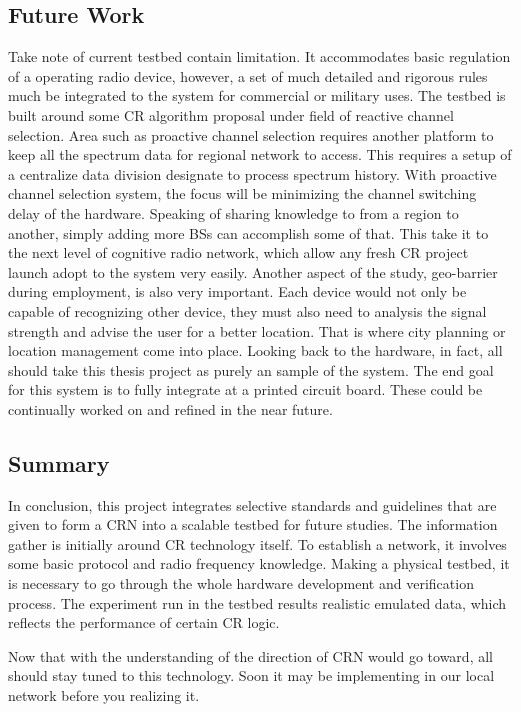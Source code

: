 \subsection{Future Work}
Take note of current testbed contain limitation. It accommodates basic regulation of a operating radio device, however, a set of much detailed and rigorous rules much be integrated to the system for commercial or military uses. The testbed is built around some CR algorithm proposal under field of reactive channel selection. Area such as proactive channel selection requires another platform to keep all the spectrum data for regional network to access. This requires a setup of a centralize data division designate to process spectrum history. With proactive channel selection system, the focus will be minimizing the channel switching delay of the hardware. Speaking of sharing knowledge to from a region to another, simply adding more BSs can accomplish some of that. This take it to the next level of cognitive radio network, which allow any fresh CR project launch adopt to the system very easily. Another aspect of the study, geo-barrier during employment, is also very important. Each device would not only be capable of recognizing other device, they must also need to analysis the signal strength and advise the user for a better location. That is where city planning or location management come into place. Looking back to the hardware, in fact, all should take this thesis project as purely an sample of the system. The end goal for this system is to fully integrate at a printed circuit board. These could be continually worked on and refined in the near future. 

\subsection{Summary}
In conclusion, this project integrates selective standards and guidelines that are given to form a CRN into a scalable testbed for future studies. The information gather is initially around CR technology itself. To establish a network, it involves some basic protocol and radio frequency knowledge. Making a physical testbed, it is necessary to go through the whole hardware development and verification process. The experiment run in the testbed results realistic emulated data, which reflects the performance of certain CR logic. 

Now that with the understanding of the direction of CRN would go toward, all should stay tuned to this technology. Soon it may be implementing in our local network before you realizing it.

